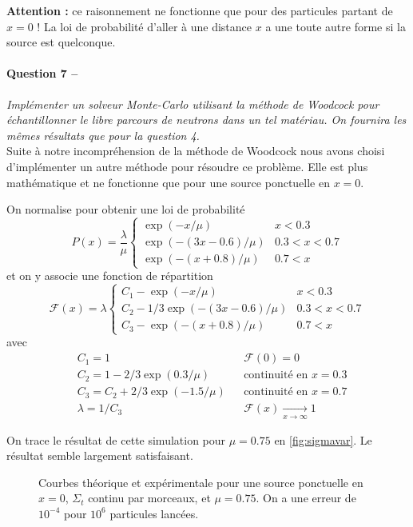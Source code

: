 \documentclass[11pt,a4paper]{article}
\newcommand{\question}[2]{\paragraph{Question #1 --}\hspace{-7pt}\textit{#2} \\}
\newcommand{\F}{\mathcal{F}}
\begin{document}
\textbf{Attention : } ce raisonnement ne fonctionne que pour des particules partant de $x=0$ ! La loi de probabilité d'aller à une distance $x$ a une toute autre forme si la source est quelconque.

\question{7}{Implémenter un solveur Monte-Carlo utilisant la méthode de Woodcock pour échantillonner le libre parcours de neutrons dans un tel matériau. On fournira les mêmes résultats que pour la question 4.}

Suite à notre incompréhension de la méthode de Woodcock nous avons choisi d'implémenter un autre méthode pour résoudre ce problème. Elle est plus mathématique et ne fonctionne que pour une source ponctuelle en $x=0$.

On normalise pour obtenir une loi de probabilité
\begin{equation}
  P(x) = \frac{\lambda}{\mu}
  \begin{cases}
    \exp(-x/\mu)         & x<0.3\\
    \exp(-(3x-0.6)/\mu) & 0.3<x<0.7\\
    \exp(-(x+0.8)/\mu)  & 0.7<x
  \end{cases}
\end{equation}
et on y associe une fonction de répartition
\begin{equation}
  \F(x) = \lambda
  \begin{cases}
    C_1 - \exp(-x/\mu)             & x<0.3\\    
    C_2 - 1/3 \exp(-(3x-0.6)/\mu) & 0.3<x<0.7\\
    C_3 - \exp(-(x+0.8)/\mu)      & 0.7<x      
  \end{cases}
\end{equation}
avec
\begin{align}
  &C_1 = 1 && \F(0)=0 \\
  &C_2 = 1 - 2/3 \exp(0.3/\mu) && \mbox{continuité en }x=0.3 \\
  &C_3 = C_2 + 2/3 \exp(-1.5/\mu) &&  \mbox{continuité en }x=0.7 \\
  &\lambda = 1/C_3 &&  \F(x)  \xrightarrow[x \to \infty]{} 1
\end{align}

On trace le résultat de cette simulation pour $\mu=0.75$ en \autoref{fig:sigmavar}. Le résultat semble largement satisfaisant.
\begin{figure}
  \centering
  \caption{Courbes théorique et expérimentale pour une source ponctuelle en $x=0$, $\Sigma_t$ continu par morceaux, et $\mu=0.75$. On a une erreur de $10^{-4}$ pour $10^6$ particules lancées.}
  \label{fig:sigmavar}
\end{figure}
\end{document}
